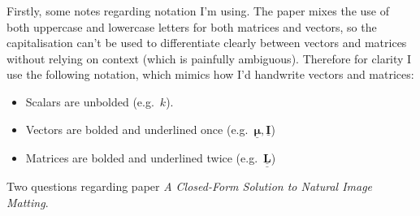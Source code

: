 \documentclass{article}
\def\vec#1{\underline{\mathbf{#1}}}
\def\vecbs#1{\underline{\boldsymbol{#1}}}
\def\mat#1{\underline{\underline{\mathbf{#1}}}}
\begin{document}
Firstly, some notes regarding notation I'm using. The paper mixes the use of both uppercase and lowercase letters for both matrices and vectors, so the capitalisation can't be used to differentiate clearly between vectors and matrices without relying on context (which is painfully ambiguous). Therefore for clarity I use the following notation, which mimics how I'd handwrite vectors and matrices:
\begin{itemize}
    \item Scalars are unbolded (e.g.\ $k$).
    \item Vectors are bolded and underlined once (e.g.\ $\vecbs\mu, \vec{I}$)
    \item Matrices are bolded and underlined twice (e.g.\ $\mat{L}$)
\end{itemize}

Two questions regarding paper \emph{A Closed-Form Solution to Natural Image Matting}.
\end{document}
